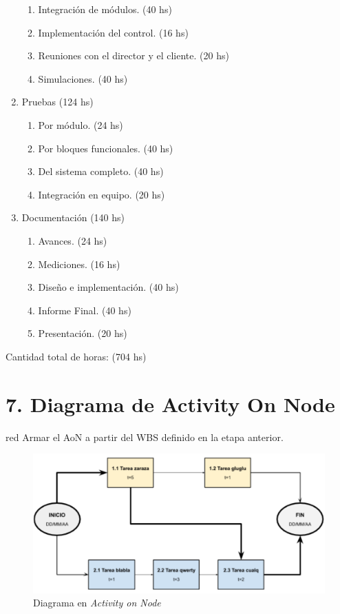 \documentclass[11pt]{charter}
\begin{document}
\begin{enumerate}
\begin{enumerate}
	\item Integración de módulos. (40 hs)
	\item Implementación del control. (16 hs)
	\item Reuniones con el director y el cliente. (20 hs)
	\item Simulaciones. (40 hs)
	\end{enumerate}
\item Pruebas (124 hs)
	\begin{enumerate}
	\item Por módulo. (24 hs)
	\item Por bloques funcionales. (40 hs)
	\item Del sistema completo. (40 hs)
	\item Integración en equipo. (20 hs)
	\end{enumerate}
\item Documentación (140 hs)
	\begin{enumerate}
	\item Avances. (24 hs)
	\item Mediciones. (16 hs)
	\item Diseño e implementación. (40 hs)
	\item Informe Final. (40 hs)
	\item Presentación. (20 hs)
	\end{enumerate}
\end{enumerate}

Cantidad total de horas: (704 hs)

\section{7. Diagrama de Activity On Node}
\label{sec:AoN}

\begin{consigna}{red}
Armar el AoN a partir del WBS definido en la etapa anterior. 



\end{consigna}

\begin{figure}[htpb]
\centering 
\includegraphics[width=.8\textwidth]{./Figuras/AoN.png}
\caption{Diagrama en \textit{Activity on Node}}
\label{fig:AoN}
\end{figure}
\end{document}
